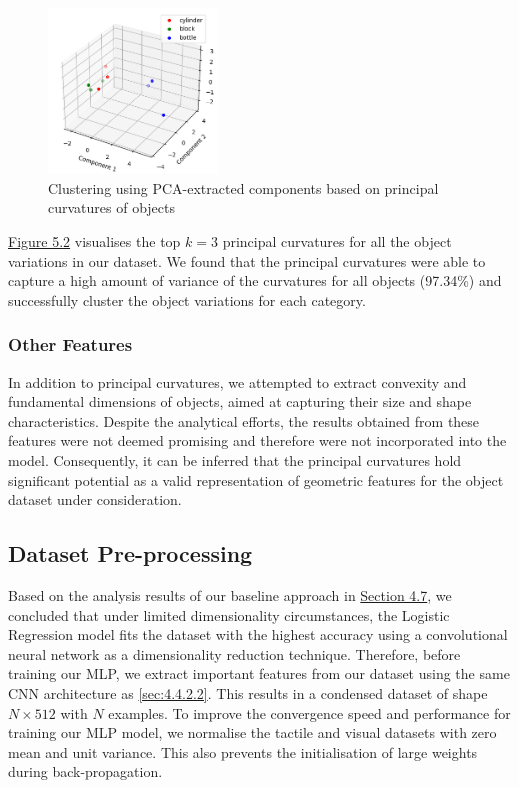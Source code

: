 \documentclass[11pt, a4paper]{report}
\begin{document}
\begin{figure}[H]
    \centering
    \includegraphics[width=0.4\textwidth]{docs/Project Report/Media/5_2_3_principal_curvature_3d.png}
    \caption{Clustering using PCA-extracted components based on principal curvatures of objects}
    \label{fig:5.2}
\end{figure}

\hyperref[fig:5.2]{Figure 5.2} visualises the top $k=3$ principal curvatures for all the object variations in our dataset. We found that the principal curvatures were able to capture a high amount of variance of the curvatures for all objects (97.34\%) and successfully cluster the object variations for each category.

\subsubsection{Other Features}\label{sec:5.2.3.2}
In addition to principal curvatures, we attempted to extract convexity and fundamental dimensions of objects, aimed at capturing their size and shape characteristics. Despite the analytical efforts, the results obtained from these features were not deemed promising and therefore were not incorporated into the model. Consequently, it can be inferred that the principal curvatures hold significant potential as a valid representation of geometric features for the object dataset under consideration.


\subsection{Dataset Pre-processing}\label{sec:5.2.4}
Based on the analysis results of our baseline approach in \hyperref[sec:4.7]{Section 4.7}, we concluded that under limited dimensionality circumstances, the Logistic Regression model fits the dataset with the highest accuracy using a convolutional neural network as a dimensionality reduction technique. Therefore, before training our MLP, we extract important features from our dataset using the same CNN architecture as \ref{sec:4.4.2.2}. This results in a condensed dataset of shape $N\times512$ with $N$ examples. To improve the convergence speed and performance for training our MLP model, we normalise the tactile and visual datasets with zero mean and unit variance. This also prevents the initialisation of large weights during back-propagation.
\end{document}

